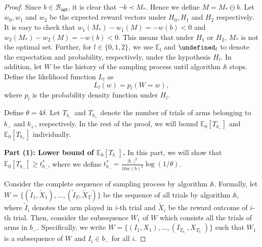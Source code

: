 \documentclass{article}
\newcommand{\E}{\mathbb E}
\newcommand{\diffvalid}{\prec}
\newcommand{\Bopt}{\mathcal B_{\mathsf{opt}}}
\let\Pr\undefined
\DeclareMathOperator{\Pr}{Pr}
\begin{document}
\begin{spacing}{1.1}
\begin{proof}
Since $b\in \Bopt$, it is clear that $\neg b \diffvalid M_*$. Hence we define $M = M_* \ominus b$.
Let $w_0, w_1$ and $w_2$ be the expected reward vectors under $H_0,H_1$ and $H_2$ respectively.
It is easy to check that 
$w_1(M_*)-w_1(M) = -w(b) < 0$ and
$w_2(M_*)-w_2(M) = -w(b) < 0$.
This means that under $H_1$ or $H_2$, $M_*$ is not the optimal set.
Further, for $l\in \{0,1,2\}$, we use $\E_l$ and $\Pr_l$ to denote the expectation and probability, respectively, under the hypothesis $H_l$.
In addition, let $W$ be the history of the sampling process until algorithm $\mathbb A$ stops.
Define the likelihood function $L_l$ as 
$$
L_l(w) = p_l(W=w),
$$
where $p_l$ is the probability density function under $H_l$.


Define $\theta=4\delta$.
Let $T_{b_-}$ and $T_{b_+}$ denote the number of trials of arms belonging to $b_-$ and $b_+$, respectively. 
In the rest of the proof, we will bound $\E_0[T_{b_-}]$ and $\E_0[T_{b_+}]$ individually.



\textbf{Part (1): Lower bound of $\E_0[T_{b_-}]$.}
In this part, we will show that $\E_0[T_{b_-}]\ge t_{b_-}^*$, where we define $t_{b_-}^* = \frac{|b_-|^2}{16 w(b)^2}\log(1/\theta)$.

Consider the complete sequence of sampling process by algorithm $\mathbb A$.
Formally, let $W=\{(\tilde I_1,\tilde X_1),\ldots, (\tilde I_T, \tilde X_T)\}$ be the sequence of all trials by algorithm $\mathbb A$, where $\tilde I_i$ denotes the arm played in $i$-th trial and $\tilde X_i$ be the reward outcome of $i$-th trial.
Then, consider the subsequence $W_1$ of $W$ which consists all the trials of arms in $b_-$.
Specifically, we write $W=\{(I_1,X_1),\ldots,(I_{T_{b_-}}, X_{T_{b_-}})\}$ such that $W_1$ is a subsequence of $W$ and $I_i \in b_-$ for all $i$.


\end{proof}
\end{spacing}
\end{document}
